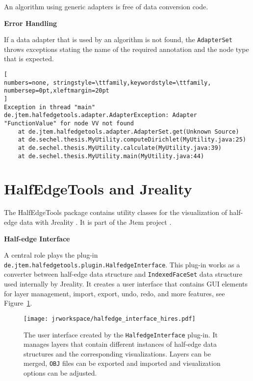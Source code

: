 \documentclass[Thesis.tex]{subfiles}
\begin{document}
An algorithm using generic adapters is free of data conversion code.


{\bf Error Handling}

If a data adapter that is used by an algorithm is not found, the {\tt AdapterSet} throws exceptions stating
the name of the required annotation and the node type that is expected. 

\begin{lstlisting}[
numbers=none, stringstyle=\ttfamily,keywordstyle=\ttfamily, numbersep=0pt,xleftmargin=20pt
]
Exception in thread "main" de.jtem.halfedgetools.adapter.AdapterException: Adapter "FunctionValue" for node VV not found
	at de.jtem.halfedgetools.adapter.AdapterSet.get(Unknown Source)
	at de.sechel.thesis.MyUtility.computeDirichlet(MyUtility.java:25)
	at de.sechel.thesis.MyUtility.calculate(MyUtility.java:39)
	at de.sechel.thesis.MyUtility.main(MyUtility.java:44)
\end{lstlisting}


\section{{\sc HalfEdgeTools} and {\sc Jreality}}
\label{sec:halfedge_tools_visualization}

The {\sc HalfEdgeTools} package contains utility classes for the visualization of half-edge data with 
{\sc Jreality} \cite{JrealityWebsite}. It is part of the {\sc Jtem} project \cite{JtemWebsite}. 

{\bf Half-edge Interface}

A central role plays the plug-in {\tt de.jtem.halfedge\-tools.plugin.Halfedge\-Interface}. This plug-in works 
as a converter between half-edge data structure and {\tt IndexedFaceSet} data structure used internally 
by {\sc Jreality}. It creates a user interface that contains GUI elements for layer management, import, export,
undo, redo, and more features, see Figure~\ref{fig:halfedge_interface}.

\begin{figure}
	\centering
	\texttt{[image: jrworkspace/halfedge\_interface\_hires.pdf]}
	\caption{The user interface created by the {\tt HalfedgeInterface} plug-in. It manages layers that
		contain different instances of half-edge data structures and the corresponding visualizations.
		Layers can be merged, {\tt OBJ} files can be exported and imported and visualization
		options can be adjusted. 
	}
	\label{fig:halfedge_interface}
\end{figure}
\end{document}
